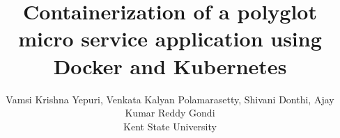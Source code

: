 \usepackage{filecontents}
\usepackage{cite}
\usepackage{amsmath,amssymb,amsfonts}
\usepackage{graphicx}
\usepackage{textcomp}
\usepackage{tabularx}
\usepackage{subcaption}
\usepackage{makecell}
\usepackage{url}
\usepackage[switch]{lineno}
\usepackage{listings}
\usepackage{multirow}
\usepackage{graphicx}

\captionsetup{compatibility=false}
\usepackage[margin=0.5in]{geometry}
\usepackage{textcomp}

\usepackage{listings}
\usepackage{tikz}
\def\checkmark{\tikz\fill[scale=0.4](0,.35) -- (.25,0) -- (1,.7) -- (.25,.15) -- cycle;} 
\graphicspath{ {./images/} }




\title{ Containerization of a polyglot micro service application using
Docker and Kubernetes 
}

\author{Vamsi Krishna Yepuri,  Venkata Kalyan Polamarasetty, Shivani Donthi, Ajay Kumar Reddy Gondi \\
Kent State University}

